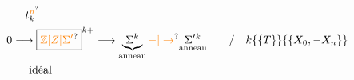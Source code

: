 \[
\begin{aligned}
&\quad\ \ t_k^{\unsure{n}}\\
&0\longrightarrow\boxed{\unsure{\mathbb Z|Z|\Sigma'}}^{k+}\longrightarrow\underbrace{\Sigma^k}_{\text{anneau}}\mathbin{\unsure{-|\to}}\underset{\text{anneau}}{\Sigma'{}^k}
\qquad /\quad k\{\{T\}\}\{\{X_0,-X_n\}\}\\
&\qquad\text{idéal}
\end{aligned}
\]


